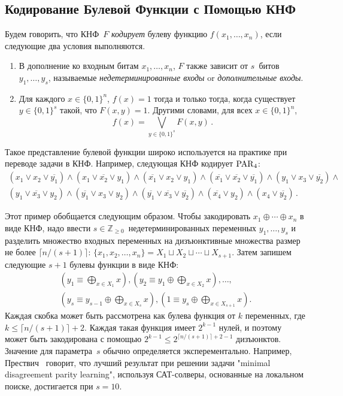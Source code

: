 \subsection{Кодирование Булевой Функции с Помощью КНФ}\label{sec:encodings}
Будем говорить, что КНФ~$F$ \emph{кодирует} булеву функцию $f(x_1, \dotsc, x_n)$, если следующие два условия выполняются.
\begin{enumerate}
	\item В дополнение ко входным битам $x_1, \dotsc, x_n$, $F$ также зависит от $s$~битов $y_1, \dotsc, y_s$, называемые \emph{недетерминированные входы} or \emph{дополнительные входы}.
	\item Для каждого $x \in \{0,1\}^n$, $f(x)=1$ тогда и только тогда, когда существует $y \in \{0,1\}^s$ такой, что $F(x,y)=1$. Другими словами, для всех $x \in \{0,1\}^n$,
	\begin{equation}\label{eq:enc}
		f(x) = \bigvee_{y \in \{0,1\}^s}F(x,y) \, .
	\end{equation}
\end{enumerate}
Такое представление булевой функции широко используется на практике при переводе задачи в КНФ.
Например, следующая КНФ кодирует $\operatorname{PAR}_4$:
\begin{multline}\label{eq:toyenc}
	(x_1 \lor x_2 \lor \overline{y_1}) \land (x_1 \lor  \overline{x_2} \lor y_1) \land (\overline{x_1} \lor x_2 \lor y_1) \land (\overline{x_1} \lor \overline{x_2} \lor \overline{y_1})
	\land
	(y_1 \lor x_3 \lor \overline{y_2}) \land\\ (y_1 \lor  \overline{x_3} \lor y_2) \land (\overline{y_1} \lor x_3 \lor y_2) \land (\overline{y_1} \lor \overline{x_3} \lor \overline{y_2})
	\land (\overline{x_4} \lor y_2) \land (x_4 \lor \overline{y_2}) \, .
\end{multline}

Этот пример обобщается следующим образом.
Чтобы закодировать $x_1 \oplus \dotsb \oplus x_n$ в виде КНФ,
надо ввести
$s \in \mathbb{Z}_{\ge 0}$~недетерминированных переменных $y_1, \dotsc, y_s$
и разделить множество входных переменных на дизъюнктивные множества размер не более $\lceil n/(s+1) \rceil$: $\{x_1, x_2, \dotsc, x_n\}=X_1 \sqcup X_2 \sqcup \dotsb \sqcup X_{s+1}$. 
Затем запишем следующие $s+1$ булевы функции в виде КНФ:
\begin{multline}\label{eq:blocks}
	\left(y_1 \equiv \bigoplus_{x \in X_1}x\right),
	\left(y_2 \equiv y_1 \oplus \bigoplus_{x \in X_2}x\right), \dotsc,\\
	\left(y_s \equiv y_{s-1} \oplus \bigoplus_{x \in X_s}x\right),
	\left(1 \equiv y_s \oplus \bigoplus_{x \in X_{s+1}}x\right).
\end{multline}
Каждая скобка может быть рассмотрена как булева функция от $k$ переменных, где $k \le \lceil n/(s+1) \rceil + 2$. Каждая такая функция имеет  $2^{k - 1}$ нулей, и поэтому может быть закодирована с помощью $2^{k - 1} \le 2^{\lceil n/(s+1) \rceil+2-1}$ дизъюнктов.
Значение для параметра~$s$ обычно определяется эксперементально. 
Например, Прествич~\cite{DBLP:journals/dam/Prestwich03} говорит, 
что лучший результат при решении задачи "minimal disagreement parity learning", используя САТ-солверы, основанные на локальном поиске, достигается при $s=10$.

